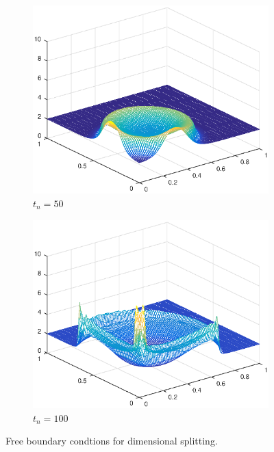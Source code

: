 \begin{figure}[h!]
    \begin{subfigure}[t]{0.48\textwidth}
        \centering
        \includegraphics[width=\textwidth]{images/sol_ds_005_per.eps}
        \caption{$t_{n}=50$}
        \label{fig:50}
    \end{subfigure}
    \begin{subfigure}[t]{0.48\textwidth}
        \centering
        \includegraphics[width=\textwidth]{images/sol_ds_0100_per.eps}
        \caption{$t_{n}=100$}
        \label{fig:100}
    \end{subfigure}
    \caption{Free boundary condtions for dimensional splitting.}
    \label{fig:2DSolutions_ds}
\end{figure}

